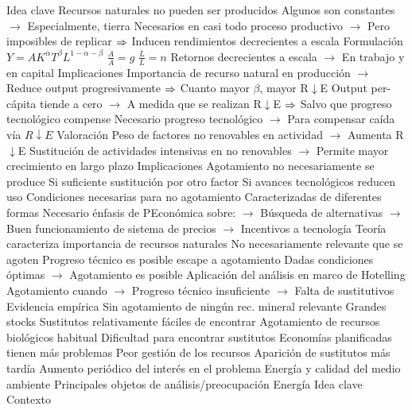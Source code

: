\documentclass{nuevotema}
\begin{document}
\begin{esquemal}
				\4 Idea clave
				\4[] Recursos naturales no pueden ser producidos
				\4[] Algunos son constantes
				\4[] $\to$ Especialmente, tierra
				\4[] Necesarios en casi todo proceso productivo
				\4[] $\to$ Pero imposibles de replicar
				\4[] $\Rightarrow$ Inducen rendimientos decrecientes a escala
				\4 Formulación
				\4[] $Y = A K^\alpha T^\beta L^{1-\alpha-\beta}$
				\4[] $\frac{\dot{A}}{A} = g$
				\4[] $\frac{\dot{L}}{L} = n$
				\4[] Retornos decrecientes a escala
				\4[] $\to$ En trabajo y en capital
				\4 Implicaciones
				\4[] Importancia de recurso natural en producción
				\4[] $\to$ Reduce output progresivamente
				\4[] $\Rightarrow$ Cuanto mayor $\beta$, mayor R$\downarrow$E
				\4[] Output per-cápita tiende a cero
				\4[] $\to$ A medida que se realizan R$\downarrow$E
				\4[] $\Rightarrow$ Salvo que progreso tecnológico compense
				\4[] Necesario progreso tecnológico
				\4[] $\to$ Para compensar caída vía $R\downarrow E$
				\4 Valoración
				\4[] Peso de factores no renovables en actividad
				\4[] $\to$ Aumenta R$\downarrow$E
				\4[] Sustitución de actividades intensivas en no renovables
				\4[] $\to$ Permite mayor crecimiento en largo plazo
			\3 Implicaciones
				\4 Agotamiento no necesariamente se produce
				\4[] Si suficiente sustitución por otro factor
				\4[] Si avances tecnológicos reducen uso
				\4 Condiciones necesarias para no agotamiento
				\4[] Caracterizadas de diferentes formas
				\4[] Necesario énfasis de PEconómica sobre:
				\4[] $\to$ Búsqueda de alternativas
				\4[] $\to$ Buen funcionamiento de sistema de precios
				\4[] $\to$ Incentivos  a tecnología
				\4 Teoría caracteriza importancia de recursos naturales
				\4[] No necesariamente relevante que se agoten
				\4[] Progreso técnico es posible escape a agotamiento
				\4[] Dadas condiciones óptimas
				\4[] $\to$ Agotamiento es posible
				\4 Aplicación del análisis en marco de Hotelling
				\4[] Agotamiento cuando
				\4[] $\to$ Progreso técnico insuficiente
				\4[] $\to$ Falta de sustitutivos
			\3 Evidencia empírica
				\4 Sin agotamiento de ningún rec. mineral relevante
				\4[] Grandes stocks
				\4[] Sustitutos relativamente fáciles de encontrar
				\4 Agotamiento de recursos biológicos habitual
				\4[] Dificultad para encontrar sustitutos
				\4 Economías planificadas tienen más problemas
				\4[] Peor gestión de los recursos
				\4[] Aparición de sustitutos más tardía
				\4 Aumento periódico del interés en el problema
				\4 Energía y calidad del medio ambiente
				\4[] Principales objetos de análisis/preocupación
		\2 Energía
			\3 Idea clave
				\4 Contexto

\end{esquemal}
\end{document}
